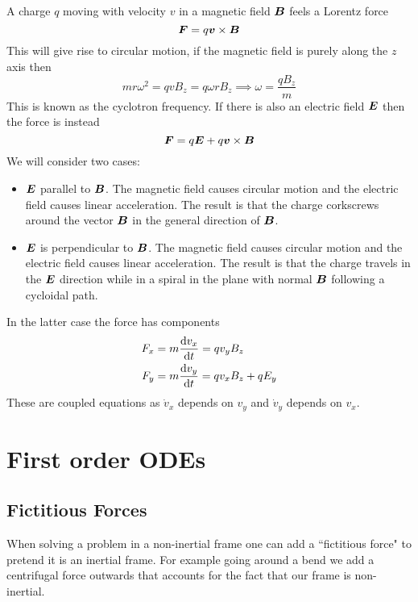 \documentclass{article}
\begin{document}
    \example
    A charge \(q\) moving with velocity \(v\) in a magnetic field \(\bm{B}\) feels a Lorentz force
    \[\bm{F} = q\bm{v}\times \bm{B}\]
    This will give rise to circular motion, if the magnetic field is purely along the \(z\) axis then
    \[mr\omega^2 = qvB_z = q\omega rB_z \implies \omega = \frac{qB_z}{m}\]
    This is known as the cyclotron frequency.
    If there is also an electric field \(\bm{E}\) then the force is instead
    \[\bm{F} = q\bm{E} + q\bm{v}\times\bm{B}\]
    We will consider two cases:
    \begin{itemize}
        \item \(\bm{E}\) parallel to \(\bm{B}\). The magnetic field causes circular motion and the electric field causes linear acceleration.
        The result is that the charge corkscrews around the vector \(\bm{B}\) in the general direction of \(\bm{B}\).
        \item \(\bm{E}\) is perpendicular to \(\bm{B}\). The magnetic field causes circular motion and the electric field causes linear acceleration.
        The result is that the charge travels in the \(\bm{E}\) direction while in a spiral in the plane with normal \(\bm{B}\) following a cycloidal path.
    \end{itemize}
    In the latter case the force has components
    \begin{align*}
        F_x &= m\dv{v_x}{t} = qv_yB_z\\
        F_y &= m\dv{v_y}{t} = qv_xB_z + qE_y
    \end{align*}
    These are coupled equations as \(\dot v_x\) depends on \(v_y\) and \(\dot v_y\) depends on \(v_x\).
    
    \section{First order ODEs}
    \subsection{Fictitious Forces}
    When solving a problem in a non-inertial frame one can add a ``fictitious force" to pretend it is an inertial frame.
    For example going around a bend we add a centrifugal force outwards that accounts for the fact that our frame is non-inertial.
    
\end{document}
